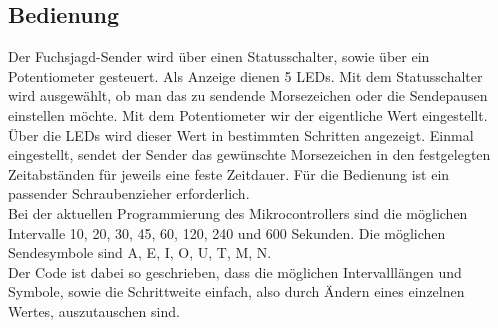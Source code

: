 \subsection{Bedienung}
Der Fuchsjagd-Sender wird über einen Statusschalter, sowie über ein Potentiometer
gesteuert. Als Anzeige dienen 5 LEDs. Mit dem Statusschalter wird ausgewählt, ob
man das zu sendende Morsezeichen oder die Sendepausen einstellen möchte.
Mit dem Potentiometer wir der eigentliche Wert eingestellt. Über die LEDs wird dieser
Wert in bestimmten Schritten angezeigt. Einmal eingestellt, sendet der Sender das gewünschte
Morsezeichen in den festgelegten Zeitabständen für jeweils eine feste Zeitdauer. Für die Bedienung ist ein passender Schraubenzieher erforderlich.\\
Bei der aktuellen Programmierung des Mikrocontrollers sind die möglichen Intervalle 10, 20, 30, 45, 60, 120, 240 und 600 Sekunden.
Die möglichen Sendesymbole sind A, E, I, O, U, T, M, N. \\
Der Code ist dabei so geschrieben, dass die möglichen Intervalllängen und Symbole, sowie die Schrittweite einfach, also durch Ändern eines einzelnen Wertes, auszutauschen sind.
